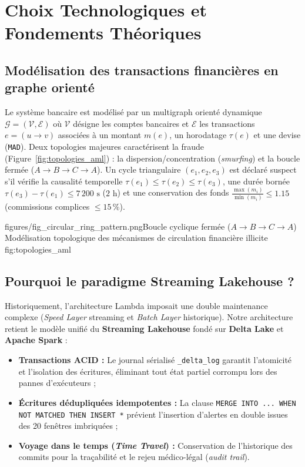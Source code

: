 
\chapter{Choix Technologiques et Fondements Théoriques}
\label{ch:state_of_art}

\section{Modélisation des transactions financières en graphe orienté}

Le système bancaire est modélisé par un multigraph orienté dynamique $\mathcal{G} = (\mathcal{V}, \mathcal{E})$ où $\mathcal{V}$ désigne les comptes bancaires et $\mathcal{E}$ les transactions $e = (u \to v)$ associées à un montant $m(e)$, un horodatage $\tau(e)$ et une devise (\texttt{MAD}). Deux topologies majeures caractérisent la fraude (Figure~\ref{fig:topologies_aml}) : la dispersion/concentration (\textit{smurfing}) et la boucle fermée ($A \to B \to C \to A$). Un cycle triangulaire $(e_1, e_2, e_3)$ est déclaré suspect s'il vérifie la causalité temporelle $\tau(e_1) \le \tau(e_2) \le \tau(e_3)$, une durée bornée $\tau(e_3) - \tau(e_1) \le 7\,200\text{ s}$ ($2\text{ h}$) et une conservation des fonds $\frac{\max(m_i)}{\min(m_i)} \le 1.15$ (commissions complices $\le 15\,\%$).

%
{figures/fig_circular_ring_pattern.png}{Boucle cyclique fermée ($A \to B \to C \to A$)}%
{Modélisation topologique des mécanismes de circulation financière illicite}%
{fig:topologies_aml}

\section{Pourquoi le paradigme Streaming Lakehouse ?}

Historiquement, l'architecture Lambda imposait une double maintenance complexe (\textit{Speed Layer} streaming et \textit{Batch Layer} historique). Notre architecture retient le modèle unifié du \textbf{Streaming Lakehouse} fondé sur \textbf{Delta Lake} et \textbf{Apache Spark} :
\begin{itemize}
    \item \textbf{Transactions ACID :} Le journal sérialisé \texttt{\_delta\_log} garantit l'atomicité et l'isolation des écritures, éliminant tout état partiel corrompu lors des pannes d'exécuteurs ;
    \item \textbf{Écritures dédupliquées idempotentes :} La clause \texttt{MERGE INTO ... WHEN NOT MATCHED THEN INSERT *} prévient l'insertion d'alertes en double issues des 20 fenêtres imbriquées ;
    \item \textbf{Voyage dans le temps (\textit{Time Travel}) :} Conservation de l'historique des commits pour la traçabilité et le rejeu médico-légal (\textit{audit trail}).
\end{itemize}

